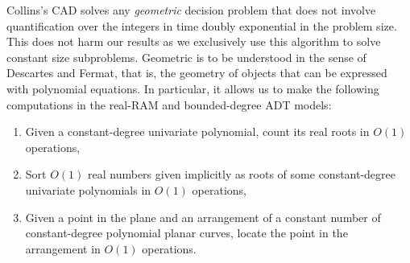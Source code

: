 Collins's CAD solves any \emph{geometric} decision problem that does not involve
quantification over the integers in time doubly exponential in the problem
size. This does not harm our results as we exclusively use this algorithm to
solve constant size subproblems. Geometric is to be understood in the sense of Descartes and Fermat, that
is, the geometry of objects that can be expressed with polynomial equations. In
particular, it allows us to make the following computations in the real-RAM and
bounded-degree ADT models:
\begin{enumerate}
\setlength{\itemsep}{0pt}
\setlength{\parskip}{0pt}
\setlength{\parsep}{0pt}
\item Given a constant-degree univariate polynomial, count its real roots
	in $O(1)$ operations,
\item Sort $O(1)$ real numbers given implicitly as roots of some
	constant-degree univariate polynomials in $O(1)$ operations,
\item Given a point in the plane and an arrangement of a constant number of
constant-degree polynomial planar curves, locate the point in the
arrangement in $O(1)$ operations.
\end{enumerate}


